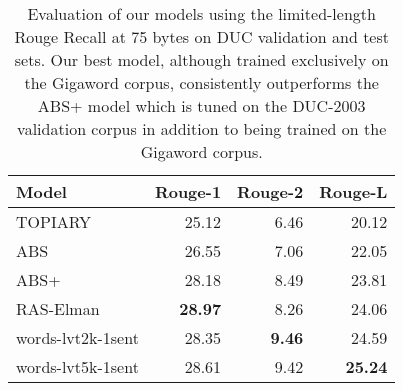 \begin{table}[h]
\centering
{\small
\begin{tabular}{|l|r|r|r|}
\hline
Model & Rouge-1 & Rouge-2 & Rouge-L \\
\hline
TOPIARY & 25.12 & 6.46 & 20.12 \\
ABS &   26.55 & 7.06 & 22.05 \\
ABS+ &   28.18 & 8.49 & 23.81 \\
RAS-Elman & {\bf 28.97} & 8.26 & 24.06 \\
words-lvt2k-1sent &  28.35 & {\bf 9.46} & 24.59 \\
words-lvt5k-1sent & 28.61 & 9.42 &  {\bf 25.24} \\
\hline
\end{tabular}
}
\caption{{\small Evaluation of our models using the limited-length Rouge Recall  at 75 bytes on DUC validation and test sets. Our best model, although trained exclusively on the Gigaword corpus, consistently outperforms the ABS+ model which is tuned on the DUC-2003 validation corpus in addition to being trained on the Gigaword corpus.}}
\label{tab:duc}
\end{table}



